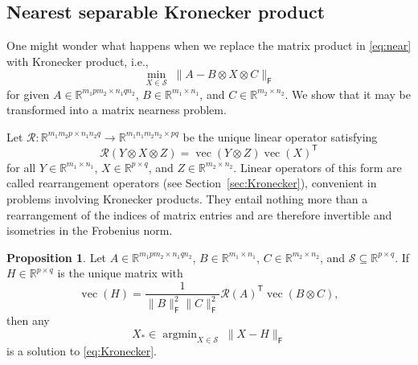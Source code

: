 \documentclass[11pt,reqno]{amsart}
\newcommand{\tp}{{\scriptscriptstyle\mathsf{T}}}
\newcommand{\F}{{\scriptscriptstyle\mathsf{F}}}
\DeclareMathOperator*{\argmin}{argmin}
\DeclareMathOperator{\vect}{vec}
\theoremstyle{definition}
\newtheorem{proposition}[theorem]{Proposition}
\numberwithin{equation}{section}
\newcommand{\R}{\mathbb{R}}
\begin{document}
\subsection{Nearest separable Kronecker product}\label{sec:Kronecker2}

One might wonder what happens when we replace the matrix product in \eqref{eq:near} with Kronecker product, i.e.,
\begin{equation}\label{eq:Kronecker}
    \min_{X \in \mathcal{S}} \; \lVert A- B \otimes X \otimes C\rVert_\F
\end{equation}
for given $A \in \R^{m_1pm_2 \times n_1qn_2}$, $B \in \R^{m_1 \times n_1}$, and $C \in \R^{m_2 \times n_2}$. We show that it may be transformed into a matrix nearness problem.

Let $\mathcal{R}:\R^{m_1m_2p \times n_1n_2q} \to \R^{m_1n_1m_2n_2 \times pq}$ be the unique linear operator satisfying 
\[
\mathcal{R}(Y \otimes X \otimes Z) = \vect(Y \otimes Z) \vect(X)^\tp
\]
for all $Y \in \R^{m_1 \times n_1}$, $X \in \R^{p \times q}$, and $Z \in \R^{m_2 \times n_2}$.  Linear operators of this form are called rearrangement operators (see Section~\ref{sec:Kronecker}), convenient in problems involving Kronecker products. They entail nothing more than a rearrangement of the indices of matrix entries and are therefore invertible and isometries in the Frobenius norm.
\begin{proposition}
Let $A \in \R^{m_1pm_2 \times n_1qn_2}$, $B \in \R^{m_1 \times n_1}$, $C \in \R^{m_2 \times n_2}$, and $\mathcal{S} \subseteq \R^{p \times q}$. If $H \in \R^{p \times q}$ is the unique matrix with
\[
\vect(H) = \frac{1}{\lVert B \rVert_\F^2 \lVert C \rVert_\F^2} \mathcal{R}(A)^\tp \vect(B \otimes C),
\]
then any
\[
X_* \in \argmin_{X \in \mathcal{S}} \; \lVert X - H \rVert_\F
\]
is a solution to \eqref{eq:Kronecker}.
\end{proposition}
\end{document}
